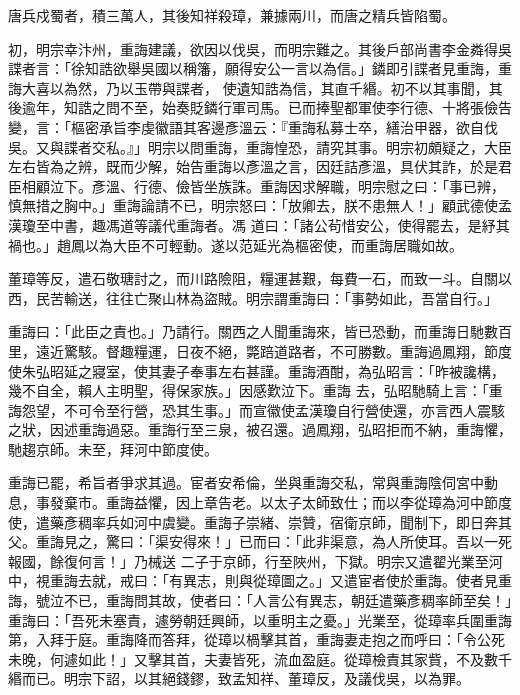\begin{pinyinscope}
 唐兵戍蜀者，積三萬人，其後知祥殺璋，兼據兩川，而唐之精兵皆陷蜀。



 初，明宗幸汴州，重誨建議，欲因以伐吳，而明宗難之。其後戶部尚書李金粦得吳諜者言：「徐知誥欲舉吳國以稱籓，願得安公一言以為信。」鏻即引諜者見重誨，重誨大喜以為然，乃以玉帶與諜者，
 使遺知誥為信，其直千緡。初不以其事聞，其後逾年，知誥之問不至，始奏貶鏻行軍司馬。已而捧聖都軍使李行德、十將張儉告變，言：「樞密承旨李虔徽語其客邊彥溫云：『重誨私募士卒，繕治甲器，欲自伐吳。又與諜者交私。』」明宗以問重誨，重誨惶恐，請究其事。明宗初頗疑之，大臣左右皆為之辨，既而少解，始告重誨以彥溫之言，因廷詰彥溫，具伏其詐，於是君臣相顧泣下。彥溫、行德、儉皆坐族誅。重誨因求解職，明宗慰之曰：「事已辨，慎無措之胸中。」重誨論請不已，明宗怒曰：「放卿去，朕不患無人！」顧武德使孟漢瓊至中書，趣馮道等議代重誨者。馮
 道曰：「諸公茍惜安公，使得罷去，是紓其禍也。」趙鳳以為大臣不可輕動。遂以范延光為樞密使，而重誨居職如故。



 董璋等反，遣石敬瑭討之，而川路險阻，糧運甚艱，每費一石，而致一斗。自關以西，民苦輸送，往往亡聚山林為盜賊。明宗謂重誨曰：「事勢如此，吾當自行。」



 重誨曰：「此臣之責也。」乃請行。關西之人聞重誨來，皆已恐動，而重誨日馳數百里，遠近驚駭。督趣糧運，日夜不絕，斃踣道路者，不可勝數。重誨過鳳翔，節度使朱弘昭延之寢室，使其妻子奉事左右甚謹。重誨酒酣，為弘昭言：「昨被讒構，幾不自全，賴人主明聖，得保家族。」因感歎泣下。重誨
 去，弘昭馳騎上言：「重誨怨望，不可令至行營，恐其生事。」而宣徽使孟漢瓊自行營使還，亦言西人震駭之狀，因述重誨過惡。重誨行至三泉，被召還。過鳳翔，弘昭拒而不納，重誨懼，馳趨京師。未至，拜河中節度使。



 重誨已罷，希旨者爭求其過。宦者安希倫，坐與重誨交私，常與重誨陰伺宮中動息，事發棄市。重誨益懼，因上章告老。以太子太師致仕；而以李從璋為河中節度使，遣藥彥稠率兵如河中虞變。重誨子崇緒、崇贊，宿衛京師，聞制下，即日奔其父。重誨見之，驚曰：「渠安得來！」已而曰：「此非渠意，為人所使耳。吾以一死報國，餘復何言！」乃械送
 二子于京師，行至陜州，下獄。明宗又遣翟光業至河中，視重誨去就，戒曰：「有異志，則與從璋圖之。」又遣宦者使於重誨。使者見重誨，號泣不已，重誨問其故，使者曰：「人言公有異志，朝廷遣藥彥稠率師至矣！」重誨曰：「吾死未塞責，遽勞朝廷興師，以重明主之憂。」光業至，從璋率兵圍重誨第，入拜于庭。重誨降而答拜，從璋以楇擊其首，重誨妻走抱之而呼曰：「令公死未晚，何遽如此！」又擊其首，夫妻皆死，流血盈庭。從璋檢責其家貲，不及數千緡而已。明宗下詔，以其絕錢鏐，致孟知祥、董璋反，及議伐吳，以為罪。




\end{pinyinscope}
